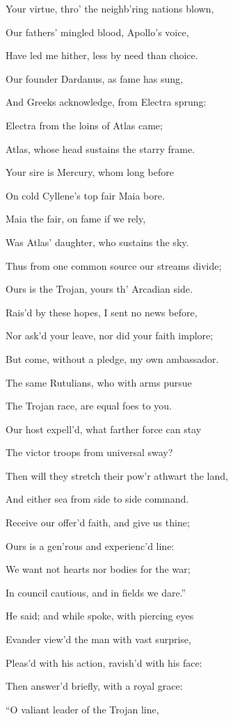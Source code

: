 Your virtue, thro’ the neighb’ring nations blown,

Our fathers’ mingled blood, Apollo’s voice,

Have led me hither, less by need than choice.

Our founder Dardanus, as fame has sung,

And Greeks acknowledge, from Electra sprung:

Electra from the loins of Atlas came;

Atlas, whose head sustains the starry frame.

Your sire is Mercury, whom long before

On cold Cyllene’s top fair Maia bore.

Maia the fair, on fame if we rely,

Was Atlas’ daughter, who sustains the sky.

Thus from one common source our streams divide;

Ours is the Trojan, yours th’ Arcadian side.

Rais’d by these hopes, I sent no news before,

Nor ask’d your leave, nor did your faith implore;

But come, without a pledge, my own ambassador.

The same Rutulians, who with arms pursue

The Trojan race, are equal foes to you.

Our host expell’d, what farther force can stay

The victor troops from universal sway?

Then will they stretch their pow’r athwart the land,

And either sea from side to side command.

Receive our offer’d faith, and give us thine;

Ours is a gen’rous and experienc’d line:

We want not hearts nor bodies for the war;

In council cautious, and in fields we dare.”

He said; and while spoke, with piercing eyes

Evander view’d the man with vast surprise,

Pleas’d with his action, ravish’d with his face:

Then answer’d briefly, with a royal grace:

“O valiant leader of the Trojan line,

